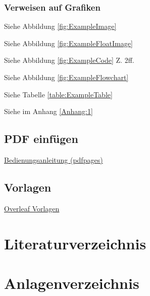\documentclass[a4paper, 11pt]{article}
\begin{document}
\subsubsection{Verweisen auf Grafiken}

Siehe Abbildung \ref{fig:ExampleImage}

Siehe Abbildung \ref{fig:ExampleFloatImage}

Siehe Abbildung \ref{fig:ExampleCode} Z. 2ff.

Siehe Abbildung \ref{fig:ExampleFlowchart}

Siehe Tabelle \ref{table:ExampleTable}

Siehe im Anhang \ref{Anhang:1}
\newpage

\subsection{PDF einfügen}

\href{https://texdoc.org/serve/pdfpages.pdf/0}{Bedienungsanleitung (pdfpages)}
%
\newpage

\subsection{Vorlagen}

\href{https://de.overleaf.com/latex/templates}{Overleaf Vorlagen}

\newpage


\setcounter{page}{\value{savepage}}

\section*{Literaturverzeichnis}


\printbibliography

\newpage
\section*{Anlagenverzeichnis}
\captionsetup[figure]{list=no}
\setcounter{figure}{0}
\renewcommand{\figurename}{Anhang}
\renewcommand{\thefigure}{\arabic{figure}}
\end{document}
